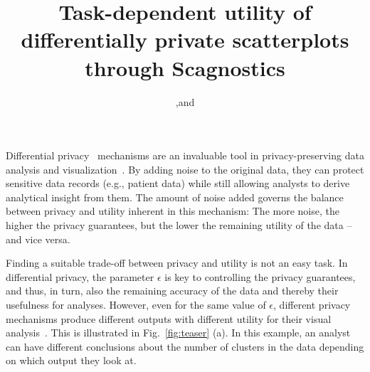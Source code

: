 \documentclass[journal]{vgtc}                     %
\title{Task-dependent utility of differentially private scatterplots through Scagnostics}
\author{%
  \authororcid{Harith Rathish}{0000-0002-1452-1814},and 
  \authororcid{Hans-Jörg Schulz}{0000-0001-9974-535X}
}
\begin{document}


\maketitle

Differential privacy~\cite{Dwork2006} mechanisms are an invaluable tool in privacy-preserving data analysis and visualization~\cite{Bhattacharjee2020}.
By adding noise to the original data, they can protect sensitive data records (e.g., patient data) while still allowing analysts to derive analytical insight from them.
The amount of noise added governs the balance between privacy and utility inherent in this mechanism: The more noise, the higher the privacy guarantees, but the lower the remaining utility of the data -- and vice versa.

Finding a suitable trade-off between privacy and utility is not an easy task.
In differential privacy, the parameter $\epsilon$ is key to controlling the privacy guarantees, and thus, in turn, also the remaining accuracy of the data and thereby their usefulness for analyses.
However, even for the same value of $\epsilon$, different privacy mechanisms produce different outputs with different utility for their visual analysis~\cite{Panavas2022}.
This is illustrated in Fig.~\ref{fig:teaser} (a). In this example, an analyst can have different conclusions about the number of clusters in the data depending on which output they look at.


\end{document}
